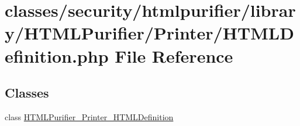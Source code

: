 \hypertarget{Printer_2HTMLDefinition_8php}{\section{classes/security/htmlpurifier/library/\+H\+T\+M\+L\+Purifier/\+Printer/\+H\+T\+M\+L\+Definition.php File Reference}
\label{Printer_2HTMLDefinition_8php}
}
\subsection*{Classes}
\begin{DoxyCompactItemize}
\item 
class \hyperlink{classHTMLPurifier__Printer__HTMLDefinition}{H\+T\+M\+L\+Purifier\+\_\+\+Printer\+\_\+\+H\+T\+M\+L\+Definition}
\end{DoxyCompactItemize}
